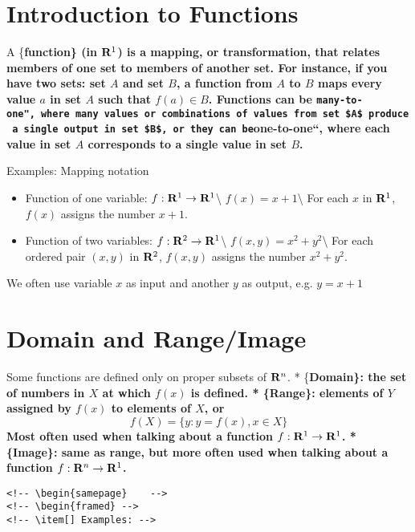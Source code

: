 \documentclass[]{book}
\providecommand{\tightlist}{%
  \setlength{\itemsep}{0pt}\setlength{\parskip}{0pt}}
\theoremstyle{definition}
\theoremstyle{definition}
\theoremstyle{definition}
\theoremstyle{remark}
\begin{document}
\section{Introduction to Functions}\label{introduction-to-functions}

A \{\bf function\} (in \({\bf R}^1\)) is a mapping, or transformation,
that relates members of one set to members of another set. For instance,
if you have two sets: set \(A\) and set \(B\), a function from \(A\) to
\(B\) maps every value \(a\) in set \(A\) such that \(f(a) \in B\).
Functions can be
\texttt{many-to-one",\ where\ many\ values\ or\ combinations\ of\ values\ from\ set\ \$A\$\ produce\ a\ single\ output\ in\ set\ \$B\$,\ or\ they\ can\ be}one-to-one``,
where each value in set \(A\) corresponds to a single value in set
\(B\).

Examples: Mapping notation

\begin{itemize}
\tightlist
\item
  Function of one variable: \(f:{\bf R}^1\to{\bf R}^1\)\textbackslash{}
  \(f(x)=x+1\)\textbackslash{} For each \(x\) in \({\bf R}^1\), \(f(x)\)
  assigns the number \(x+1\).
\item
  Function of two variables:
  \(f: {\bf R}^2\to{\bf R}^1\)\textbackslash{}
  \(f(x,y)=x^2+y^2\)\textbackslash{} For each ordered pair \((x,y)\) in
  \({\bf R}^2\), \(f(x,y)\) assigns the number \(x^2+y^2\).
\end{itemize}

We often use variable \(x\) as input and another \(y\) as output, e.g.
\(y=x+1\)

\section{Domain and Range/Image}\label{domain-and-rangeimage}

Some functions are defined only on proper subsets of \({\bf R}^n\). *
\{\bf Domain\}: the set of numbers in \(X\) at which \(f(x)\) is
defined. * \{\bf Range\}: elements of \(Y\) assigned by \(f(x)\) to
elements of \(X\), or \[f(X)=\{ y : y=f(x), x\in X\}\] Most often used
when talking about a function \(f:{\bf R}^1\to{\bf R}^1\). *
\{\bf Image\}: same as range, but more often used when talking about a
function \(f:{\bf R}^n\to{\bf R}^1\).

\begin{verbatim}
<!-- \begin{samepage}    -->
<!-- \begin{framed} -->
<!-- \item[] Examples: -->
\end{verbatim}
\end{document}
